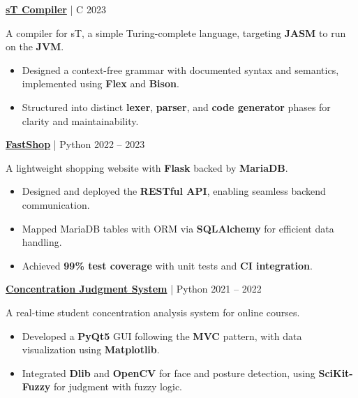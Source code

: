 \documentclass[11pt]{article}
\begin{document}
\vspace{6pt}

\textbf{\href{https://github.com/Lai-YT/st-lang}{sT Compiler}} | C \hfill 2023

A compiler for sT, a simple Turing-complete language, targeting \textbf{JASM} to run on the \textbf{JVM}.
\begin{itemize}[noitemsep, topsep=0pt, partopsep=0pt, parsep=0pt, leftmargin=*]
    \item Designed a context-free grammar with documented syntax and semantics, implemented using \textbf{Flex} and \textbf{Bison}.
    \item Structured into distinct \textbf{lexer}, \textbf{parser}, and \textbf{code generator} phases for clarity and maintainability.
\end{itemize}

\vspace{6pt}

\textbf{\href{https://github.com/c1ydehhx/FastShop}{FastShop}} | Python \hfill 2022 -- 2023

A lightweight shopping website with \textbf{Flask} backed by \textbf{MariaDB}.
\begin{itemize}[noitemsep, topsep=0pt, partopsep=0pt, parsep=0pt, leftmargin=*]
    \item Designed and deployed the \textbf{RESTful  API}, enabling seamless backend communication.
    \item Mapped MariaDB tables with ORM via \textbf{SQLAlchemy} for efficient data handling.
    \item Achieved \textbf{99\% test coverage} with unit tests and \textbf{CI integration}.
\end{itemize}

\vspace{6pt}

\textbf{\href{https://github.com/Lai-YT/webcam-applications}{Concentration Judgment System}} | Python \hfill 2021 -- 2022

A real-time student concentration analysis system for online courses.
\begin{itemize}[noitemsep, topsep=0pt, partopsep=0pt, parsep=0pt, leftmargin=*]
    \item Developed a \textbf{PyQt5} GUI following the \textbf{MVC} pattern, with data visualization using \textbf{Matplotlib}.
    \item Integrated \textbf{Dlib} and \textbf{OpenCV} for face and posture detection, using \textbf{SciKit-Fuzzy} for judgment with fuzzy logic.
\end{itemize}
\end{document}
